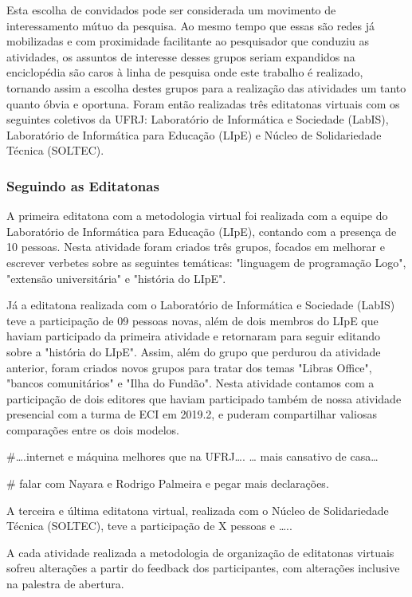 Esta escolha de convidados pode ser considerada um movimento de interessamento mútuo da pesquisa. Ao mesmo tempo que essas são redes já mobilizadas e com proximidade facilitante ao pesquisador que conduziu as atividades, os assuntos de interesse desses grupos seriam expandidos na enciclopédia são caros à linha de pesquisa onde este trabalho é realizado, tornando assim a escolha destes grupos para a realização das atividades um tanto quanto óbvia e oportuna.
 Foram então realizadas três editatonas virtuais com os seguintes coletivos da UFRJ: Laboratório de Informática e Sociedade (LabIS), Laboratório de Informática para Educação (LIpE) e Núcleo de Solidariedade Técnica (SOLTEC).
 
\subsubsection{Seguindo as Editatonas}

A primeira editatona com a metodologia virtual foi realizada com a equipe do Laboratório de Informática para Educação (LIpE), contando com a presença de 10 pessoas. Nesta atividade foram criados três grupos, focados em melhorar e escrever verbetes sobre as seguintes temáticas: "linguagem de programação Logo", "extensão universitária" e "história do LIpE".

Já a editatona realizada com o Laboratório de Informática e Sociedade (LabIS) teve a participação de 09 pessoas novas, além de dois membros do LIpE que haviam participado da primeira atividade e retornaram para seguir editando sobre a "história do LIpE". Assim, além do grupo que perdurou da atividade anterior, foram criados novos grupos para tratar dos temas "Libras Office", "bancos comunitários" e "Ilha do Fundão". Nesta atividade contamos com a participação de dois editores que haviam participado também de nossa atividade presencial com a turma de ECI em 2019.2, e puderam compartilhar valiosas comparações entre os dois modelos.

#….internet e máquina melhores que na UFRJ…. … mais cansativo de casa…

# falar com Nayara e Rodrigo Palmeira e pegar mais declarações.

A terceira e última editatona virtual, realizada com o Núcleo de Solidariedade Técnica (SOLTEC), teve a participação de X pessoas e …..

A cada atividade realizada a metodologia de organização de editatonas virtuais sofreu alterações a partir do feedback dos participantes, com alterações inclusive na palestra de abertura.

